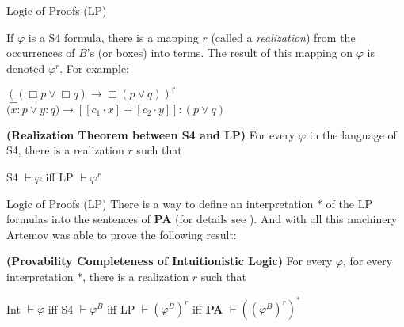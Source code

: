 \documentclass{beamer}
\theoremstyle{definition}
\newcommand{\ou}{\vee}
\newcommand{\impli}{\rightarrow}
\newcommand{\teo}{\vdash}
\begin{document}
\begin{frame} {Logic of Proofs (LP)}

\qquad If $\varphi$ is a S4 formula, there is a mapping $r$ (called a \textit{realization}) from the occurrences of $B$'s (or boxes) into terms. The result of this mapping on $\varphi$ is denoted $\varphi^{r}$. For example:


\begin{center}
$((\Box p \ou \Box q ) \impli \Box(p\ou q))^{r}$\\ $=$\\ $(x$$:$$ p \ou y$$:$$ q ) \impli [[c_{1}\cdot x] + [c_{2}\cdot y]]$$:$$
(p\ou q)$
\end{center}




\textbf{(Realization Theorem between S4 and LP)} For every $\varphi$ in the language of S4, there is a realization $r$ such that

\begin{center}
S4 $\teo \varphi$ iff LP $\teo \varphi^{r}$ 
\end{center}



\end{frame}


\begin{frame}{Logic of Proofs (LP)}
\qquad There is a way to define an interpretation $*$ of the LP formulas into the sentences of \textbf{PA} (for details see \cite{Artemov01}). And with all this machinery Artemov was able to prove the following result:

\vspace{5mm}


\textbf{(Provability Completeness of Intuitionistic Logic)} For every $\varphi$, for every interpretation $*$, there is a realization $r$ such that

\begin{center}
Int $\teo \varphi$ iff S4 $\teo \varphi^{B}$ iff LP $\teo (\varphi^{B})^{r}$ iff \textbf{PA} $\teo ((\varphi^{B})^{r})^{*}$
\end{center}
\end{frame}
\end{document}
